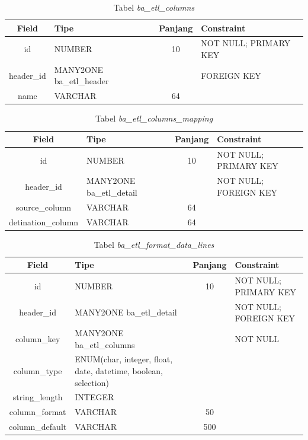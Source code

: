 \begin{table}[H]
	\centering
		\caption{Tabel \textit{ba\_etl\_columns}}
		\begin{tabular}{ | c | p{4cm} | c | p{4cm} |}
			\hline
				Field & Tipe & Panjang & Constraint \\ \hline \hline
			id & NUMBER & 10 & NOT NULL; PRIMARY KEY  \\ \hline
			header\_id & MANY2ONE ba\_etl\_header & &  FOREIGN KEY  \\ \hline 
			name & VARCHAR & 64 & \\ \hline 
		\end{tabular}
\end{table}

\begin{table}[H]
	\centering
		\caption{Tabel \textit{ba\_etl\_columns\_mapping}}
		\begin{tabular}{ | c | p{4cm} | c | p{4cm} |}
			\hline
				Field & Tipe & Panjang & Constraint \\ \hline \hline
			id & NUMBER & 10 & NOT NULL; PRIMARY KEY  \\ \hline
			header\_id & MANY2ONE ba\_etl\_detail & & NOT NULL; FOREIGN KEY  \\ \hline 
			source\_column & VARCHAR & 64 &  \\ \hline 
			detination\_column & VARCHAR & 64 &  \\ \hline 
		\end{tabular}
\end{table}

\begin{table}[H]
	\centering
		\caption{Tabel \textit{ba\_etl\_format\_data\_lines}}
		\begin{tabular}{ | c | p{4cm} | c | p{4cm} |}
			\hline
				Field & Tipe & Panjang & Constraint \\ \hline \hline
			id & NUMBER & 10 & NOT NULL; PRIMARY KEY  \\ \hline
			header\_id & MANY2ONE ba\_etl\_detail & & NOT NULL; FOREIGN KEY  \\ \hline 
			column\_key & MANY2ONE ba\_etl\_columns &  & NOT NULL  \\ \hline 
			column\_type & ENUM(char, integer, float, date, datetime, boolean, selection) &  &  \\ \hline 
		string\_length & INTEGER &  &  \\ \hline
		column\_format & VARCHAR & 50 &  \\ \hline
		column\_default & VARCHAR & 500  &  \\ \hline
		\end{tabular}
\end{table}

